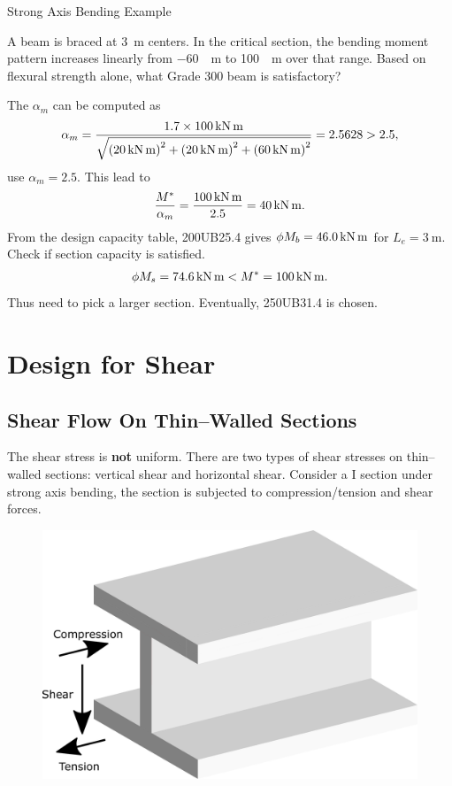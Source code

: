 \begin{exmp}
Strong Axis Bending Example

A beam is braced at \SI{3}{\meter} centers. In the critical section, the bending moment pattern increases linearly from \SI{-60}{\kn\meter} to \SI{100}{\kn\meter} over that range. Based on flexural strength alone, what Grade 300 beam is satisfactory?
\begin{figure}[H]

\end{figure}
\end{exmp}
\begin{solution}
The $\alpha_m$ can be computed as
\begin{gather*}
\alpha_m=\dfrac{1.7\times\SI{100}{\kilo\newton\meter}}{\sqrt{\left(\SI{20}{\kilo\newton\meter}\right)^2+\left(\SI{20}{\kilo\newton\meter}\right)^2+\left(\SI{60}{\kilo\newton\meter}\right)^2}}=2.5628>2.5,
\end{gather*}
use $\alpha_m=2.5$. This lead to
\begin{gather*}
\dfrac{M^*}{\alpha_m}=\dfrac{\SI{100}{\kilo\newton\meter}}{2.5}=\SI{40}{\kilo\newton\meter}.
\end{gather*}
From the design capacity table, 200UB25.4 gives $\phi{}M_b=\SI{46.0}{\kilo\newton\meter}$ for $L_e=\SI{3}{\meter}$. Check if section capacity is satisfied.
\begin{gather*}
\phi{}M_s=\SI{74.6}{\kilo\newton\meter}<M^*=\SI{100}{\kilo\newton\meter}.
\end{gather*}
Thus need to pick a larger section. Eventually, 250UB31.4 is chosen.
\end{solution}
\section{Design for Shear}
\subsection{Shear Flow On Thin--Walled Sections}
The shear stress is \textbf{not} uniform. There are two types of shear stresses on thin--walled sections: vertical shear and horizontal shear. Consider a I section under strong axis bending, the section is subjected to compression/tension and shear forces.
\begin{figure}[H]
\centering
\includegraphics[width=.7\textwidth]{PIC/CH05/SFA}
\end{figure}
